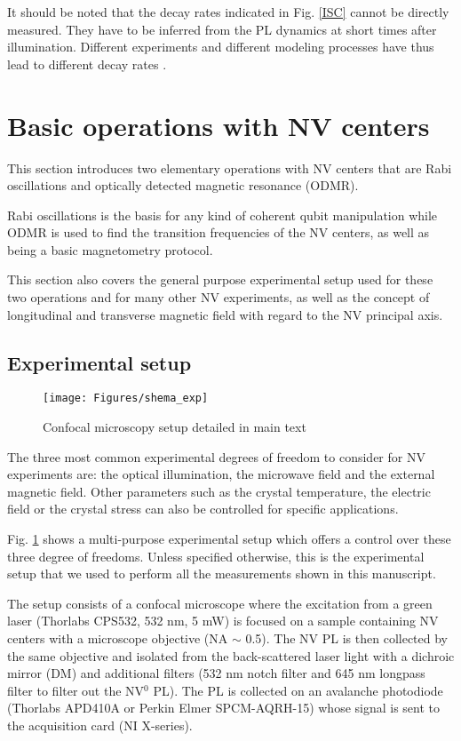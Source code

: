 \documentclass[a4paper,11pt]{report}
\begin{document}
It should be noted that the decay rates indicated in Fig. \ref{ISC} cannot be directly measured. They have to be inferred from the PL dynamics at short times after illumination. Different experiments and different modeling processes have thus lead to different decay rates \citep{duarte2021effect}. 


\section{Basic operations with NV centers}

This section introduces two elementary operations with NV centers that are Rabi oscillations and optically detected magnetic resonance (ODMR).

Rabi oscillations is the basis for any kind of coherent qubit manipulation while ODMR is used to find the transition frequencies of the NV centers, as well as being a basic magnetometry protocol.

This section also covers the general purpose experimental setup used for these two operations and for many other NV experiments, as well as the concept of longitudinal and transverse magnetic field with regard to the NV principal axis.

\subsection{Experimental setup}
\begin{figure}[h!]
\centering
\texttt{[image: Figures/shema\_exp]}
\caption{Confocal microscopy setup detailed in main text}
\label{setup}
\end{figure}
The three most common experimental degrees of freedom to consider for NV experiments are: the optical illumination, the microwave field and the external magnetic field. Other parameters such as the crystal temperature, the electric field or the crystal stress can also be controlled for specific applications.

Fig. \ref{setup} shows a multi-purpose experimental setup which offers a control over these three degree of freedoms. Unless specified otherwise, this is the experimental setup that we used to perform all the measurements shown in this manuscript. 

The setup consists of a confocal microscope where the excitation from a green laser (Thorlabs CPS532, 532 nm, 5 mW) is focused on a sample containing NV centers with a microscope objective (NA $\sim$ 0.5). The NV PL is then collected by the same objective and isolated from the back-scattered laser light with a dichroic mirror (DM) and additional filters (532 nm notch filter and 645 nm longpass filter to filter out the NV$^0$ PL). The PL is collected on an avalanche photodiode (Thorlabs APD410A or Perkin Elmer SPCM-AQRH-15) whose signal is sent to the acquisition card (NI X-series).
\end{document}
